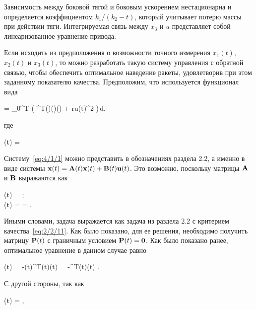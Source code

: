 Зависимость между боковой тягой и боковым ускорением нестационарна и определяется коэффициентом $k_1 / (k_2 - t)$, который учитывает потерю массы при действии тяги. Интегрируемая связь между $x_3$ и $u$ представляет собой линеаризованное уравнение привода.


Если исходить из предположения о возможности точного измерения $x_1(t)$, $x_2(t)$ и $x_3(t)$, то можно разработать такую систему управления с обратной связью, чтобы обеспечить оптимальное наведение ракеты, удовлетворив при этом заданному показателю качества. Предположим, что используется функционал вида

	\funcF =  \int\limits_0^T \bigl( ^T(\tau)(\tau)(\tau) + ru(t)^2 \bigr)\,d\tau \mbox{,}
\eeq

где

	(t) =  
\eeq

Систему~\ref{eq:4/1/1} можно представить в обозначениях раздела 2.2, а именно в виде системы $\mathbf{x}(t) = \mathbf{A}(t)\mathbf{x}(t) + \mathbf{B}(t)\mathbf{u}(t)$. Это возможно, поскольку матрицы $\mathbf{A}$ и $\mathbf{B}$ выражаются как

\beqarr
		(t) =  \mbox{;} \\
		(t) =  =  \mbox{.}
\eeqarr

Иными словами, задача выражается как задача из раздела 2.2 с критерием качества~\vref{eq:2/2/11}. Как было показано, для ее решения, необходимо получить матрицу $\mathbf{P}(t)$ с граничным условием $\mathbf{P}(t) = \mathbf{0}$. Как было показано ранее, оптимальное уравнение в данном случае равно

	\optU(t) = -(t)^T(t)(t) = -^T(t)(t) \mbox{.}
\eeq

С другой стороны, так как

	(t) =  \mbox{,}
\eeq

